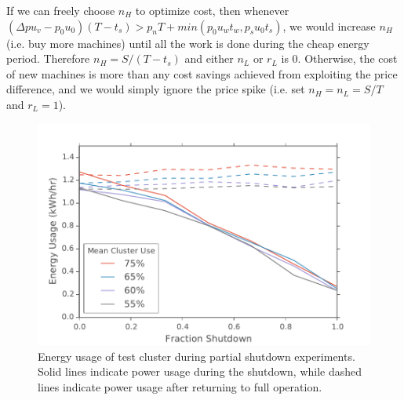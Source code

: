 If we can freely choose $n_H$ to optimize cost, then whenever $(\Delta p u_v - p_0 u_0)(T-t_s) > p_n T + min(p_0 u_w t_w,p_s u_0 t_s)$, we would increase $n_H$ (i.e. buy more machines) until all the work is done during the cheap energy period. Therefore $n_H = S/(T-t_s)$ and either $n_L$ or $r_L$ is $0$.  Otherwise, the cost of new machines is more than any cost savings achieved from exploiting the price difference, and we would simply ignore the price spike (i.e. set $n_H = n_L = S/T$ and $r_L = 1$).

\begin{figure}[t]
	\begin{center}
		\includegraphics[scale=0.55]{edeals/down_v_pow}
	\end{center}
	\caption{Energy usage of test cluster during partial shutdown experiments.  Solid lines indicate power usage during the shutdown, while dashed lines indicate power usage after returning to full operation.}
	\label{down_v_pow}
\end{figure}

